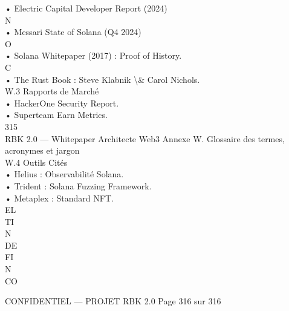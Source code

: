 • Electric Capital Developer Report (2024)\\
N\\
• Messari State of Solana (Q4 2024)\\
O\\
• Solana Whitepaper (2017) : Proof of History.\\
C\\
\vspace{0.5em}
• The Rust Book : Steve Klabnik \textbackslash{}& Carol Nichols.\\
\vspace{0.5em}
\vspace{0.5em}
\vspace{0.5em}
W.3 Rapports de Marché\\
• HackerOne Security Report.\\
• Superteam Earn Metrics.\\
\vspace{0.5em}
\vspace{0.5em}
\vspace{0.5em}
\vspace{0.5em}
315\\
RBK 2.0 — Whitepaper Architecte Web3                                Annexe W. Glossaire des termes, acronymes et jargon\\
\vspace{0.5em}
\vspace{0.5em}
\vspace{0.5em}
W.4 Outils Cités\\
• Helius : Observabilité Solana.\\
• Trident : Solana Fuzzing Framework.\\
• Metaplex : Standard NFT.\\
\vspace{0.5em}
\vspace{0.5em}
\vspace{0.5em}
\vspace{0.5em}
EL\\
TI\\
N\\
DE\\
FI\\
N\\
CO\\
\vspace{0.5em}
\vspace{0.5em}
\vspace{0.5em}
\vspace{0.5em}
\begin{confidential}CONFIDENTIEL — PROJET RBK 2.0                    Page 316 sur 316\end{confidential}
\vspace{0.5em}

